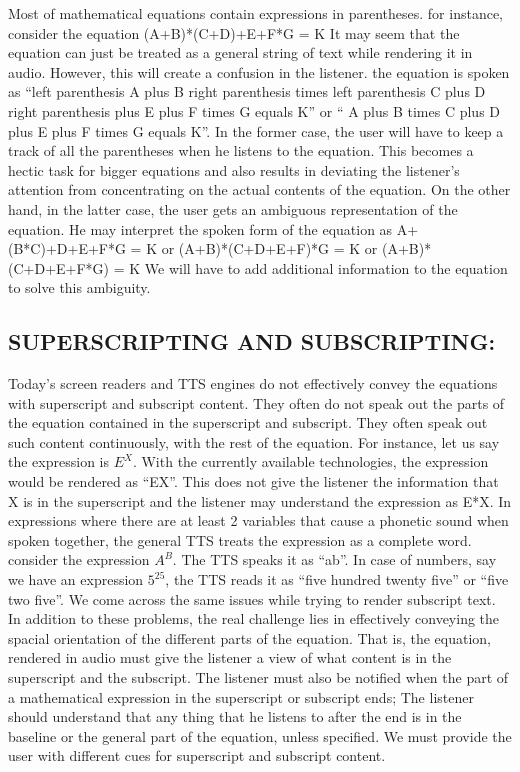 \documentclass{article}
\begin{document}
Most of mathematical equations contain expressions in parentheses. for instance, consider the equation
(A+B)*(C+D)+E+F*G = K
It may seem that the equation can just be treated as a general string of text while rendering it in audio. However, this will create a confusion in the listener. the equation is spoken as “left parenthesis A plus B right parenthesis times left parenthesis C plus D right parenthesis plus E plus F times G equals K” or “ A plus B times C plus D plus E plus F times G equals K”. In the former case, the user will have to keep a track of all the parentheses when he listens to the equation. This becomes a hectic task for bigger equations and also results in deviating the listener’s attention from concentrating on the actual contents of the equation. On the other hand, in the latter
case, the user gets an ambiguous representation of the equation. He may interpret the spoken form of the equation as
A+(B*C)+D+E+F*G = K
or
(A+B)*(C+D+E+F)*G = K
or
(A+B)*(C+D+E+F*G) = K
We will have to add additional information to the equation to solve this ambiguity.

\subsection{SUPERSCRIPTING AND SUBSCRIPTING:}
\label{ssec:subsubhead}



Today’s screen readers and TTS engines do not effectively convey the equations with superscript and subscript content. They often do not speak out the parts of the equation contained in the superscript and subscript. They often speak out such content continuously, with the rest of the equation. For instance, let us say the expression is $E^X$. With the currently available technologies, the expression would be rendered as “EX”. This does not give the listener the information that X is in the superscript and the listener may understand the expression as E*X. In expressions where there are at least 2 variables that cause a phonetic sound when spoken together, the general TTS treats the expression as a complete word. consider the expression $A^B$. The TTS speaks it as “ab”. In case of numbers, say we have an expression $5^25$, the TTS reads it as “five hundred twenty five” or “five two five”. We come across the same issues while trying to render subscript text. In addition to these problems, the real challenge lies in effectively conveying the spacial orientation of the different parts of the equation. That is, the equation, rendered in audio must give the listener a view of what content is in the superscript and the subscript. The listener must also be notified when the part of a mathematical expression in the superscript or subscript ends; The listener should understand that any thing that he listens to after the end is in the baseline or the general part of the equation, unless specified. We must provide the user with different cues for superscript and subscript content.
\end{document}
